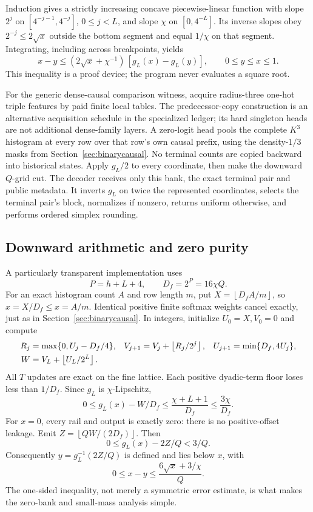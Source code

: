 \documentclass[11pt,letterpaper]{article}
\theoremstyle{definition}\newtheorem{definition}[theorem]{Definition}
\theoremstyle{remark}\newtheorem{remark}[theorem]{Remark}
\newcommand{\floor}[1]{\left\lfloor #1\right\rfloor}
\begin{document}
Induction gives a strictly increasing concave piecewise-linear function with slope $2^j$ on $[4^{-j-1},4^{-j}]$, $0\le j<L$, and slope $\chi$ on $[0,4^{-L}]$. Its inverse slopes obey $2^{-j}\le2\sqrt x$ outside the bottom segment and equal $1/\chi$ on that segment. Integrating, including across breakpoints, yields
\begin{equation}\label{eq:companderinverse}
 x-y\le(2\sqrt x+\chi^{-1})\,[g_L(x)-g_L(y)],
 \qquad 0\le y\le x\le1.
\end{equation}
This inequality is a proof device; the program never evaluates a square root.

For the generic dense-causal comparison witness, acquire radius-three one-hot triple features by paid finite local tables. The predecessor-copy construction is an alternative acquisition schedule in the specialized ledger; its hard singleton heads are not additional dense-family layers. A zero-logit head pools the complete $K^3$ histogram at every row over that row's own causal prefix, using the density-$1/3$ masks from Section~\ref{sec:binarycausal}. No terminal counts are copied backward into historical states. Apply $g_L/2$ to every coordinate, then make the downward $Q$-grid cut. The decoder receives only this bank, the exact terminal pair and public metadata. It inverts $g_L$ on twice the represented coordinates, selects the terminal pair's block, normalizes if nonzero, returns uniform otherwise, and performs ordered simplex rounding.

\subsection{Downward arithmetic and zero purity}
A particularly transparent implementation uses
\[
 P=h+L+4,\qquad D_f=2^P=16\chi Q.
\]
For an exact histogram count $A$ and row length $m$, put
$X=\floor{D_fA/m}$, so $\widehat x=X/D_f\le x=A/m$.
Identical positive finite softmax weights cancel exactly, just as in Section~\ref{sec:binarycausal}. In integers, initialize $U_0=X,V_0=0$ and compute
\begin{align}\label{eq:downrails}
 R_j&=\max\{0,U_j-D_f/4\},&
 V_{j+1}&=V_j+\floor{R_j/2^j},&
 U_{j+1}&=\min\{D_f,4U_j\},\\
 W&=V_L+\floor{U_L/2^L}.&&&&\notag
\end{align}
All $T$ updates are exact on the fine lattice. Each positive dyadic-term floor loses less than $1/D_f$. Since $g_L$ is $\chi$-Lipschitz,
\begin{equation}\label{eq:downerror}
 0\le g_L(x)-W/D_f
 \le\frac{\chi+L+1}{D_f}\le\frac{3\chi}{D_f}.
\end{equation}
For $x=0$, every rail and output is exactly zero: there is no positive-offset leakage. Emit $Z=\floor{QW/(2D_f)}$. Then
\[
 0\le g_L(x)-2Z/Q<3/Q.
\]
Consequently $y=g_L^{-1}(2Z/Q)$ is defined and lies below $x$, with
\begin{equation}\label{eq:inverseerror}
 0\le x-y\le\frac{6\sqrt x+3/\chi}{Q}.
\end{equation}
The one-sided inequality, not merely a symmetric error estimate, is what makes the zero-bank and small-mass analysis simple.
\end{document}
